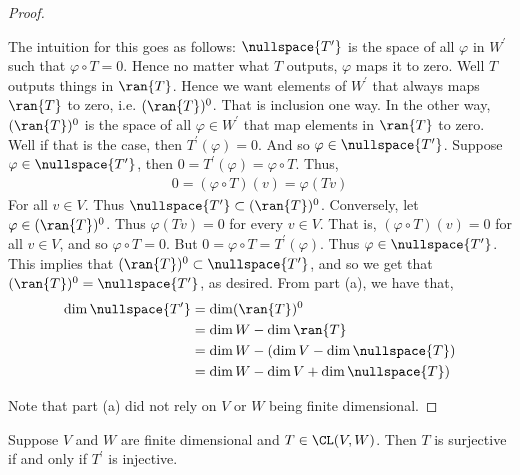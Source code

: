 \documentclass{article}
\begin{document}
  \begin{proof}
    \begin{enumerate}[label=\alph*)]
      \ii 
      The intuition for this goes as follows: $\nullspace{T^\prime}$ is the space of all $\varphi$ in $W^\prime$ such that $\varphi \circ T = 0$. Hence no matter what $T$ outputs, $\varphi$
      maps it to zero. Well $T$ outputs things in $\ran{T}$. Hence we want elements of $W^\prime$ that always maps $\ran{T}$ to zero, i.e. $(\ran{T})^0$. That is inclusion one way. In
      the other way, $(\ran{T})^{0}$ is the space of all $\varphi \in W^{\prime}$ that map elements in $\ran{T}$ to zero. Well if that is the case, then $T^{\prime}(\varphi) = 0$. And so
      $\varphi \in \nullspace{T^{\prime}}$.
        Suppose $\varphi \in \nullspace{T^{\prime}}$, then $0 = T^{\prime}(\varphi) = \varphi \circ T$. Thus,
        \begin{align*}
          0 = (\varphi \circ T)(v) = \varphi(Tv)
        \end{align*}
        For all $v \in V$. Thus $\nullspace{T^{\prime}} \subset (\ran{T})^0$. Conversely, let $\varphi \in (\ran{T})^0$. Thus $\varphi(Tv) = 0$ for every $v \in V$. That is, $(\varphi \circ
        T)(v) = 0$ for all $v \in V$, and so $\varphi \circ T = 0$.  But $0 = \varphi \circ T = T^{\prime}(\varphi)$. Thus $\varphi \in \nullspace{T^{\prime}}$. This implies that
        $(\ran{T})^0 \subset \nullspace{T^{\prime}}$, and so we get that $(\ran{T})^0 = \nullspace{T^{\prime}}$, as desired.
      \ii 
        From part (a), we have that,
        \begin{align*}
          \dim\nullspace{T^{\prime}} & = \dim(\ran{T})^0 \\
          & = \dim W - \dim\ran{T} \\
          & = \dim W - (\dim V - \dim\nullspace{T}) \\
          & = \dim W - \dim V + \dim\nullspace{T}) \\
        \end{align*}
    \end{enumerate}
    Note that part (a) did not rely on $V$ or $W$ being finite dimensional. 
  \end{proof}
  \begin{prop}
    Suppose $V$ and $W$ are finite dimensional and $T \in \CL(V, W)$. Then $T$ is surjective if and only if $T^{\prime}$ is injective.
  \end{prop}
\end{document}
